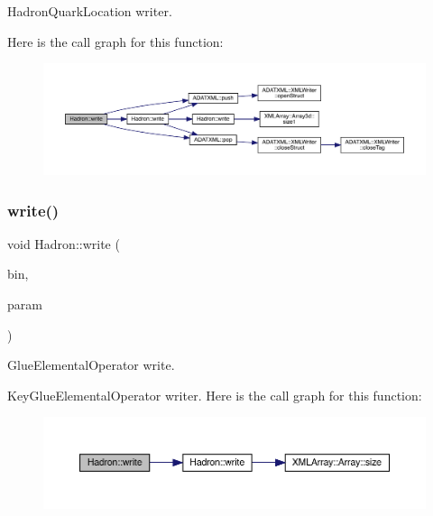 Hadron\+Quark\+Location writer. 

Here is the call graph for this function\+:
\nopagebreak
\begin{figure}[H]
\begin{center}
\leavevmode
\includegraphics[width=350pt]{d1/daf/namespaceHadron_a2737e3c3e39c76c6dbe81ce5e484f6cc_cgraph}
\end{center}
\end{figure}
\mbox{\label{namespaceHadron_a91e2c5264aeab6dfb2be779cf7140626}} 
\subsubsection{\texorpdfstring{write()}{write()}\hspace{0.1cm}{\footnotesize\ttfamily [47/95]}}
{\footnotesize\ttfamily void Hadron\+::write (\begin{DoxyParamCaption}\item[{\mbox{\hyperlink{classADATIO_1_1BinaryWriter}{Binary\+Writer}} \&}]{bin,  }\item[{const \mbox{\hyperlink{structHadron_1_1KeyGlueElementalOperator__t}{Key\+Glue\+Elemental\+Operator\+\_\+t}} \&}]{param }\end{DoxyParamCaption})}



Glue\+Elemental\+Operator write. 

Key\+Glue\+Elemental\+Operator writer. Here is the call graph for this function\+:
\nopagebreak
\begin{figure}[H]
\begin{center}
\leavevmode
\includegraphics[width=350pt]{d1/daf/namespaceHadron_a91e2c5264aeab6dfb2be779cf7140626_cgraph}
\end{center}
\end{figure}
\mbox{\label{namespaceHadron_acd7055ec4bbdda7ceb335f7271aee72e}} 
